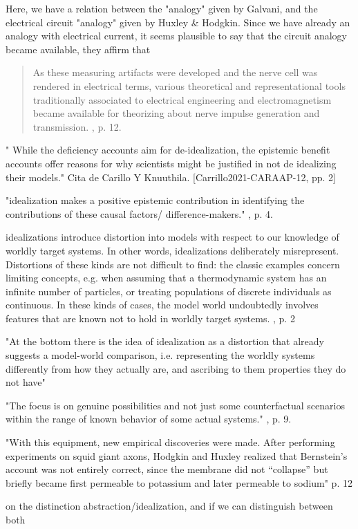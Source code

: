 Here, we have a relation between the "analogy" given by Galvani, and the electrical circuit "analogy" given by Huxley \& Hodgkin.
Since we have already an analogy with electrical current, it seems plausible to say that the circuit analogy became available, they affirm that

\begin{quote}
	As these measuring artifacts were developed and the nerve cell was rendered in electrical  terms, various theoretical and representational tools traditionally associated to electrical  engineering and electromagnetism  became available for theorizing about nerve impulse generation and transmission. \cite{Carrillo2021-CARAAP-12}, p. 12.
\end{quote}





" While the deficiency accounts aim for de-idealization, the epistemic benefit accounts offer reasons for why scientists might be justified in not de idealizing their models." Cita de Carillo Y Knuuthila. [Carrillo2021-CARAAP-12, pp. 2]

"idealization  makes a positive epistemic contribution in identifying the contributions of these causal  factors/ difference-makers."
\cite{Carrillo2021-CARAAP-12}, p. 4.

idealizations introduce distortion into models with respect to our
knowledge of worldly target systems. In other words, idealizations deliberately misrepresent. Distortions of these kinds are not difficult to find: the classic examples concern limiting concepts, e.g. when assuming that  a thermodynamic system has an infinite number of particles, or treating populations of discrete individuals as continuous. In these kinds of cases, the model world undoubtedly involves features that are known not to hold in worldly target systems. \cite{Carrillo2021-CARAAP-12}, p. 2

"At the bottom there is  the idea of idealization as a distortion that already suggests a model-world comparison, i.e.  representing the worldly systems differently from how they actually are, and ascribing to  them properties they do not have" \cite{Carrillo2021-CARAAP-12}

"The focus is on genuine possibilities and not just some counterfactual scenarios  within the range of known behavior of some actual systems." \cite{Carrillo2021-CARAAP-12}, p. 9.

"With this equipment, new empirical discoveries were made. After performing  experiments on squid giant axons, Hodgkin and Huxley realized that Bernstein’s account was  not entirely correct, since the membrane did not “collapse” but briefly became first  permeable to potassium and later permeable to sodium" p. 12


on the distinction abstraction/idealization, and if we can distinguish between both
